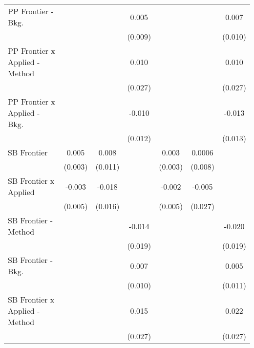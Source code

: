 \begin{tabular}{lcccccc}
   PP Frontier - Bkg.             &              &             & 0.005          &                &             & 0.007\\   
                                  &              &             & (0.009)        &                &             & (0.010)\\   
   PP Frontier x Applied - Method &              &             & 0.010          &                &             & 0.010\\   
                                  &              &             & (0.027)        &                &             & (0.027)\\   
   PP Frontier x Applied - Bkg.   &              &             & -0.010         &                &             & -0.013\\   
                                  &              &             & (0.012)        &                &             & (0.013)\\   
   SB Frontier                    & 0.005        & 0.008       &                & 0.003          & 0.0006      &   \\   
                                  & (0.003)      & (0.011)     &                & (0.003)        & (0.008)     &   \\   
   SB Frontier x Applied          & -0.003       & -0.018      &                & -0.002         & -0.005      &   \\   
                                  & (0.005)      & (0.016)     &                & (0.005)        & (0.027)     &   \\   
   SB Frontier - Method           &              &             & -0.014         &                &             & -0.020\\   
                                  &              &             & (0.019)        &                &             & (0.019)\\   
   SB Frontier - Bkg.             &              &             & 0.007          &                &             & 0.005\\   
                                  &              &             & (0.010)        &                &             & (0.011)\\   
   SB Frontier x Applied - Method &              &             & 0.015          &                &             & 0.022\\   
                                  &              &             & (0.027)        &                &             & (0.027)\\   

\end{tabular}
